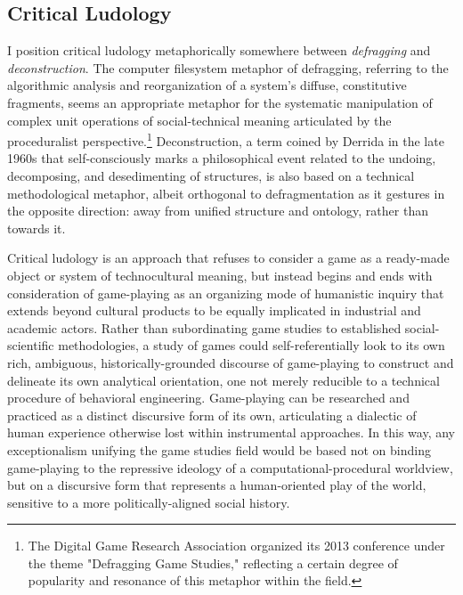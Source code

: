 \subsection*{Critical Ludology}
I position critical ludology metaphorically somewhere between \emph{defragging} and \emph{deconstruction}. The computer filesystem metaphor of defragging, referring to the algorithmic analysis and reorganization of a system's diffuse, constitutive fragments, seems an appropriate metaphor for the systematic manipulation of complex unit operations of social-technical meaning articulated by the proceduralist perspective.\footnote{
  The Digital Game Research Association organized its 2013 conference under the theme "Defragging Game Studies," reflecting a certain degree of popularity and resonance of this metaphor within the field.
}
Deconstruction, a term coined by Derrida in the late 1960s that self-consciously marks a philosophical event related to the undoing, decomposing, and desedimenting of structures, is also based on a technical methodological metaphor, albeit orthogonal to defragmentation as it gestures in the opposite direction: away from unified structure and ontology, rather than towards it.

Critical ludology is an approach that refuses to consider a game as a ready-made object or system of technocultural meaning, but instead begins and ends with consideration of game-playing as an organizing mode of humanistic inquiry that extends beyond cultural products to be equally implicated in industrial and academic actors. Rather than subordinating game studies to established social-scientific methodologies, a study of games could self-referentially look to its own rich, ambiguous, historically-grounded discourse of game-playing to construct and delineate its own analytical orientation, one not merely reducible to a technical procedure of behavioral engineering. Game-playing can be researched and practiced as a distinct discursive form of its own, articulating a dialectic of human experience otherwise lost within instrumental approaches. In this way, any exceptionalism unifying the game studies field would be based not on binding game-playing to the repressive ideology of a computational-procedural worldview, but on a discursive form that represents a human-oriented play of the world, sensitive to a more politically-aligned social history.

